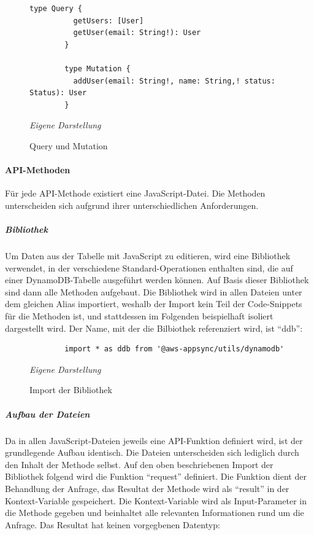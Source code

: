 		\begin{figure}[H]
		\centering
		\begin{minipage}[t]{.7\textwidth} %
		\caption{Query und Mutation} %
		\begin{lstlisting}[style=graphql]
		type Query {
		  getUsers: [User]
		  getUser(email: String!): User
		}
		
		type Mutation {
		  addUser(email: String!, name: String,! status: Status): User
		}
		\end{lstlisting}
		\textit{Eigene Darstellung} %
		\label{fig:queryAndMutation}
		\end{minipage}
		\end{figure}
	
	
	\paragraph{API-Methoden}
	Für jede API-Methode existiert eine JavaScript-Datei. Die Methoden unterscheiden sich aufgrund ihrer unterschiedlichen Anforderungen.
	\subparagraph{Bibliothek}
	Um Daten aus der Tabelle mit JavaScript zu editieren, wird eine Bibliothek verwendet, in der verschiedene Standard-Operationen enthalten sind, die auf einer DynamoDB-Tabelle ausgeführt werden können. Auf Basis dieser Bibliothek sind dann alle Methoden aufgebaut. Die Bibliothek wird in allen Dateien unter dem gleichen Alias importiert, weshalb der Import kein Teil der Code-Snippets für die Methoden ist, und stattdessen im Folgenden beispielhaft isoliert dargestellt wird. Der Name, mit der die Bilbiothek referenziert wird, ist ``ddb'':\newline
		\begin{figure}[H]
		\centering
		\begin{minipage}[t]{.7\textwidth} %
		\caption{Import der Bibliothek} %
		\begin{verbatim}
		import * as ddb from '@aws-appsync/utils/dynamodb'
		\end{verbatim}
		
		\textit{Eigene Darstellung} %
		\label{fig:bibliothekImport}
		\end{minipage}
		\end{figure}
	\subparagraph{Aufbau der Dateien}
	Da in allen JavaScript-Dateien jeweils eine API-Funktion definiert wird, ist der grundlegende Aufbau identisch. Die Dateien unterscheiden sich lediglich durch den Inhalt der Methode selbst. 
	Auf den oben beschriebenen Import der Bibliothek folgend wird die Funktion ``request'' definiert. Die Funktion dient der Behandlung der Anfrage, das Resultat der Methode wird als ``result'' in der Kontext-Variable gespeichert. Die Kontext-Variable wird als Input-Parameter in die Methode gegeben und beinhaltet alle relevanten Informationen rund um die Anfrage. Das Resultat hat keinen vorgegbenen Datentyp:\newline
